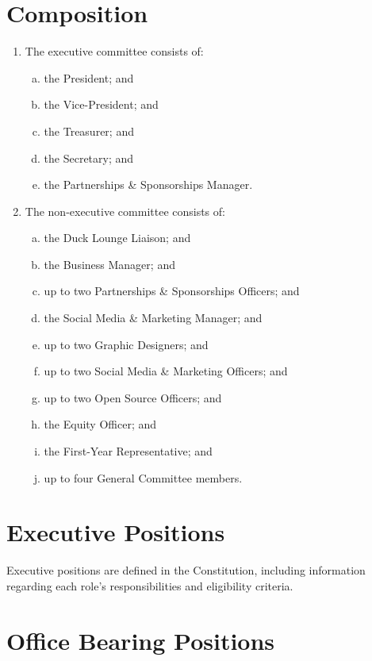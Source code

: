 \documentclass{schedule}
\begin{document}
\section{Composition}\label{composition}
\begin{enumerate}[(1)]
    \item The executive committee consists of:
          \begin{enumerate}[(a)]
              \item the President; and
              \item the Vice-President; and
              \item the Treasurer; and
              \item the Secretary; and
              \item the Partnerships \& Sponsorships Manager.
          \end{enumerate}
    \item The non-executive committee consists of:
          \begin{enumerate}[(a)]
              \item the Duck Lounge Liaison; and
              \item the Business Manager; and
              \item up to two Partnerships \& Sponsorships Officers; and
              \item the Social Media \& Marketing Manager; and
              \item up to two Graphic Designers; and
              \item up to two Social Media \& Marketing Officers; and
              \item up to two Open Source Officers; and
              \item the Equity Officer; and
              \item the First-Year Representative; and
              \item up to four General Committee members.
          \end{enumerate}
\end{enumerate}


\section{Executive Positions}
Executive positions are defined in the Constitution, including information regarding each role's responsibilities and eligibility criteria.


\section{Office Bearing Positions}
\end{document}
